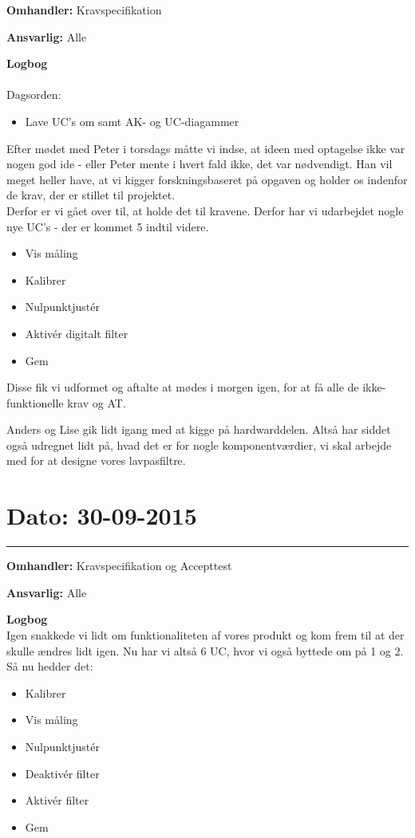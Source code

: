 \textbf{Omhandler:} Kravspecifikation 

\textbf{Ansvarlig:} Alle 

\textbf{Logbog}
\\
\\
Dagsorden:
\begin{itemize}
\item Lave UC's om samt AK- og UC-diagammer
\end{itemize}

Efter mødet med Peter i torsdags måtte vi indse, at ideen med optagelse ikke var nogen god ide - eller Peter mente i hvert fald ikke, det var nødvendigt. Han vil meget heller have, at vi kigger forskningsbaseret på opgaven og holder os indenfor de krav, der er stillet til projektet.\\
Derfor er vi gået over til, at holde det til kravene. Derfor har vi udarbejdet nogle nye UC's - der er kommet 5 indtil videre. 
\begin{itemize}
	\item Vis måling 
	\item Kalibrer
	\item Nulpunktjustér 
	\item Aktivér digitalt filter
	\item Gem 
\end{itemize}

Disse fik vi udformet og aftalte at mødes i morgen igen, for at få alle de ikke-funktionelle krav og AT. 

Anders og Lise gik lidt igang med at kigge på hardwarddelen. Altså har siddet også udregnet lidt på, hvad det er for nogle komponentværdier, vi skal arbejde med for at designe vores lavpasfiltre.  


\section{Dato: 30-09-2015 }
\hrule

\textbf{Omhandler:} Kravspecifikation og Accepttest  

\textbf{Ansvarlig:} Alle 

\textbf{Logbog}
\\
Igen snakkede vi lidt om funktionaliteten af vores produkt og kom frem til at der skulle ændres lidt igen. Nu har vi altså 6 UC, hvor vi også byttede om på 1 og 2. Så nu hedder det: 
\begin{itemize}
	\item Kalibrer
	\item Vis måling 
	\item Nulpunktjustér 
	\item Deaktivér filter 
	\item Aktivér filter
	\item Gem 
\end{itemize}

